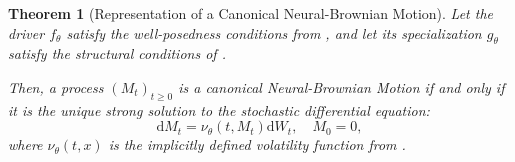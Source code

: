 \documentclass[qian]{imsart}
\newcommand{\dd}{\mathrm{d}}
\theoremstyle{plain}
\newtheorem{theorem}{Theorem}[section]
\theoremstyle{definition}
\begin{document}
\begin{theorem}[Representation of a Canonical Neural-Brownian Motion]
\label{thm:nbm_representation}
Let the driver $f_\theta$ satisfy the well-posedness conditions from , and let its specialization $g_\theta$ satisfy the structural conditions of .

Then, a process $(M_t)_{t \ge 0}$ is a canonical Neural-Brownian Motion if and only if it is the unique strong solution to the stochastic differential equation:
\begin{equation}
\label{eq:nbm_sde}
    \dd M_t = \nu_\theta(t, M_t) \dd W_t, \quad M_0 = 0,
\end{equation}
where $\nu_\theta(t,x)$ is the implicitly defined volatility function from .
\end{theorem}
\end{document}

